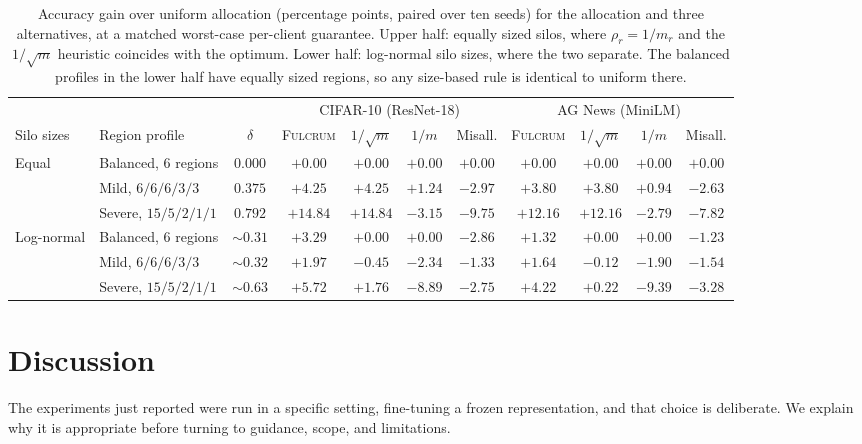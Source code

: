 \documentclass[acmsmall,screen,review,anonymous]{acmart}
\theoremstyle{acmdefinition}%
\newcommand{\Fulcrum}{\textsc{Fulcrum}\xspace}
\begin{document}
\begin{table}[t]
\caption{Accuracy gain over uniform allocation (percentage points, paired over ten seeds) for the allocation and three alternatives, at a matched worst-case per-client guarantee. Upper half: equally sized silos, where $\rho_r = 1/m_r$ and the $1/\sqrt{m}$ heuristic coincides with the optimum. Lower half: log-normal silo sizes, where the two separate. The balanced profiles in the lower half have equally sized regions, so any size-based rule is identical to uniform there.}
\label{tab:baselines}
\centering
\footnotesize
\setlength{\tabcolsep}{2.6pt}
\begin{tabular}{@{}llc cccc cccc@{}}
\toprule
& & & \multicolumn{4}{c}{CIFAR-10 (ResNet-18)} & \multicolumn{4}{c}{AG News (MiniLM)} \\
\cmidrule(lr){4-7}\cmidrule(lr){8-11}
Silo sizes & Region profile & $\delta$
& \Fulcrum & $1/\sqrt{m}$ & $1/m$ & Misall.
& \Fulcrum & $1/\sqrt{m}$ & $1/m$ & Misall. \\
\midrule
\multirow{3}{*}{Equal}
 & Balanced, 6 regions & $0.000$ & $+0.00$ & $+0.00$ & $+0.00$ & $+0.00$ & $+0.00$ & $+0.00$ & $+0.00$ & $+0.00$ \\
 & Mild, $6/6/6/3/3$   & $0.375$ & $+4.25$ & $+4.25$ & $+1.24$ & $-2.97$ & $+3.80$ & $+3.80$ & $+0.94$ & $-2.63$ \\
 & Severe, $15/5/2/1/1$& $0.792$ & $\mathbf{+14.84}$ & $\mathbf{+14.84}$ & $-3.15$ & $-9.75$ & $\mathbf{+12.16}$ & $\mathbf{+12.16}$ & $-2.79$ & $-7.82$ \\
\midrule
\multirow{3}{*}{Log-normal}
 & Balanced, 6 regions & $\sim\!0.31$ & $\mathbf{+3.29}$ & $+0.00$ & $+0.00$ & $-2.86$ & $\mathbf{+1.32}$ & $+0.00$ & $+0.00$ & $-1.23$ \\
 & Mild, $6/6/6/3/3$   & $\sim\!0.32$ & $\mathbf{+1.97}$ & $-0.45$ & $-2.34$ & $-1.33$ & $\mathbf{+1.64}$ & $-0.12$ & $-1.90$ & $-1.54$ \\
 & Severe, $15/5/2/1/1$& $\sim\!0.63$ & $\mathbf{+5.72}$ & $+1.76$ & $-8.89$ & $-2.75$ & $\mathbf{+4.22}$ & $+0.22$ & $-9.39$ & $-3.28$ \\
\bottomrule
\end{tabular}
\end{table}

\section{Discussion}
\label{sec:discussion}

The experiments just reported were run in a specific setting, fine-tuning a
frozen representation, and that choice is deliberate. We explain why it is
appropriate before turning to guidance, scope, and limitations.
\end{document}
